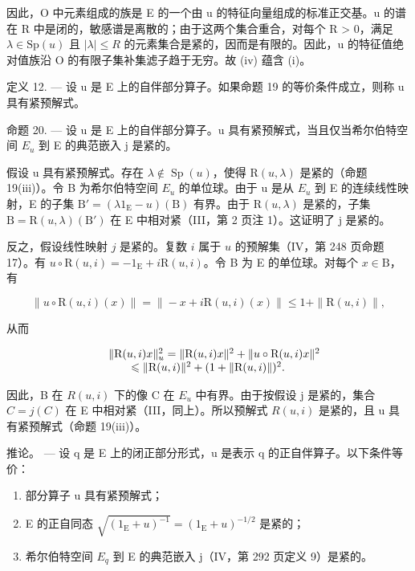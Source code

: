 因此，O 中元素组成的族是 E 的一个由 u 的特征向量组成的标准正交基。u 的谱在 R 中是闭的，敏感谱是离散的；由于这两个集合重合，对每个 R > 0，满足 \(\lambda \in \mathrm{Sp}(u)\) 且 \(|\lambda| \leqslant R\) 的元素集合是紧的，因而是有限的。因此，u 的特征值绝对值族沿 O 的有限子集补集滤子趋于无穷。故 (iv) 蕴含 (i)。

定义 12. --- 设 u 是 E 上的自伴部分算子。如果命题 19 的等价条件成立，则称 u 具有紧预解式。

命题 20. --- 设 u 是 E 上的自伴部分算子。u 具有紧预解式，当且仅当希尔伯特空间 \(E_{u}\) 到 E 的典范嵌入 j 是紧的。

假设 u 具有紧预解式。存在 \(\lambda \notin \operatorname{Sp}(u)\)，使得 \(\mathrm{R}(u, \lambda)\) 是紧的（命题 19(iii)）。令 B 为希尔伯特空间 \(E_{u}\) 的单位球。由于 u 是从 \(E_{u}\) 到 E 的连续线性映射，E 的子集 \(\mathrm{B}' = (\lambda 1_{\mathrm{E}} - u)(\mathrm{B})\) 有界。由于 \(\mathrm{R}(u, \lambda)\) 是紧的，子集 \(\mathrm{B} = \mathrm{R}(u, \lambda)(\mathrm{B}')\) 在 E 中相对紧（III，第 2 页注 1）。这证明了 j 是紧的。

 反之，假设线性映射 \(j\) 是紧的。复数 \(i\) 属于 \(u\) 的预解集（IV，第 248 页命题 17）。有 \(u \circ \mathrm{R}(u, i) = -1_{\mathrm{E}} + i\mathrm{R}(u, i)\)。令 B 为 E 的单位球。对每个 \(x \in \mathrm{B}\)，有

\[
\| u \circ \mathrm{R} (u, i) (x) \| = \| - x + i \mathrm{R} (u, i) (x) \| \leqslant 1 + \| \mathrm{R} (u, i) \|,
\]

从而

\[
\begin{array}{r l} & {\| \mathrm{R} (u, i) x \| _ {u} ^ {2} = \| \mathrm{R} (u, i) x \| ^ {2} + \| u \circ \mathrm{R} (u, i) x \| ^ {2}} \\ & {\qquad \leqslant \| \mathrm{R} (u, i) \| ^ {2} + (1 + \| \mathrm{R} (u, i) \|) ^ {2}.} \end{array}
\]

因此，B 在 \(R(u,i)\) 下的像 C 在 \(E_{u}\) 中有界。由于按假设 j 是紧的，集合 \(C = j(C)\) 在 E 中相对紧（III，同上）。所以预解式 \(R(u,i)\) 是紧的，且 u 具有紧预解式（命题 19(iii)）。

推论。 --- 设 q 是 E 上的闭正部分形式，u 是表示 q 的正自伴算子。以下条件等价：

\begin{enumerate}
\def\labelenumi{(\roman{enumi})}
\item
  部分算子 u 具有紧预解式；
\item
  E 的正自同态 \(\sqrt{(1_{\mathrm{E}} + u)^{-1}} = (1_{\mathrm{E}} + u)^{-1 / 2}\) 是紧的；
\item
  希尔伯特空间 \(E_{q}\) 到 E 的典范嵌入 j（IV，第 292 页定义 9）是紧的。
\end{enumerate}

